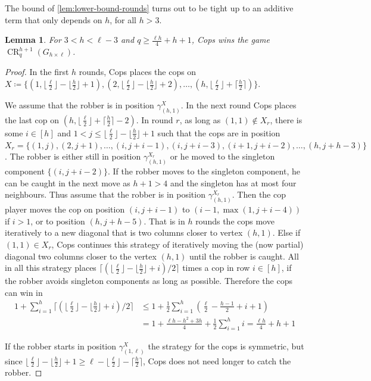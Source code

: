 \documentclass[10pt,a4paper]{article}
\newtheorem{lemma}[theorem]{Lemma}
\DeclareMathOperator{\CR}{CR}
\newcommand{\grid}[2]{\ensuremath{G_{#1 \times #2}}}
\begin{document}
The bound of \cref{lem:lower-bound-rounds} turns out to be tight up to an additive term that only depends on $h$, for all $h>3$.

\begin{lemma}
	\label{lem:upper-bound-rounds}
	For $3<h<\ell-3$ and $q\geq \frac{\ell h}{4} + h +1$, Cops wins the game $\CR_q^{h+1}(\grid{h}{\ell})$.
\end{lemma}

\begin{proof}
	In the first $h$ rounds, Cops places the cops on $X\coloneqq\{(1,\lfloor\frac{\ell}{2}\rfloor-\lfloor\frac{h}{2}\rfloor+1),(2,\lfloor\frac{\ell}{2}\rfloor-\lfloor\frac{h}{2}\rfloor+2),\ldots,(h,\lfloor\frac{\ell}{2}\rfloor+\lceil\frac{h}{2}\rceil)\}$.
	
	We assume that the robber is in position $\gamma_{(h,1)}^X$.
	In the next round Cops places the last cop on $(h,\lfloor\frac{\ell}{2}\rfloor+\lceil\frac{h}{2}\rceil - 2)$.
	In round $r$, as long as $(1,1)\notin X_r$, there is some $i\in[h]$ and $1<j\leq \lfloor\frac{\ell}{2}\rfloor-\lfloor\frac{h}{2}\rfloor+1$ such that the cops are in position $X_{r}=\{(1,j), (2,j+1), \ldots, (i,j+i-1), (i,j+i-3), (i+1,j+i-2), \ldots, (h,j+h-3)\}$.
	The robber is either still in position $\gamma_{(h,1)}^{X_{r}}$ or he moved to the singleton component $\{(i,j+i-2)\}$.
	If the robber moves to the singleton component, he can be caught in the next move as $h+1>4$ and the singleton has at most four neighbours.
	Thus assume that the robber is in position $\gamma_{(h,1)}^{X_{r}}$.
	Then the cop player moves the cop on position $(i,j+i-1)$ to $(i-1,\max(1,j+i-4))$ if $i>1$, or to position $(h,j+h-5)$.
	That is in $h$ rounds the cops move iteratively to a new diagonal that is two columns closer to vertex $(h,1)$.
	Else if $(1,1)\in X_r$, Cops continues this strategy of iteratively moving the (now partial) diagonal two columns closer to the vertex $(h,1)$ until the robber is caught.
	All in all this strategy places $\lceil(\lfloor\frac{\ell}{2}\rfloor-\lfloor\frac{h}{2}\rfloor+i)/2\rceil$ times a cop in row $i\in [h]$, if the robber avoids singleton components as long as possible.
	Therefore the cops can win in
	\begin{align*}
	1 + \sum_{i=1}^{h} \lceil(\lfloor\frac{\ell}{2}\rfloor-\lfloor\frac{h}{2}\rfloor+i)/2\rceil &\leq 1 + \frac12 \sum_{i=1}^{h} (\frac{\ell}{2}-\frac{h-1}{2}+i+1)\\
		&= 1 + \frac{\ell h-h^2+3h}{4} +\frac12\sum_{i=1}^{h} i = \frac{\ell h}{4} + h + 1
	\end{align*}
	
	If the robber starts in position $\gamma_{(1,\ell)}^X$ the strategy for the cops is symmetric, but since $\lfloor\frac{\ell}{2}\rfloor-\lfloor\frac{h}{2}\rfloor+1\geq \ell - \lfloor\frac{\ell}{2}\rfloor - \lceil\frac{h}{2}\rceil$, Cops does not need longer to catch the robber.
\end{proof}
\end{document}
